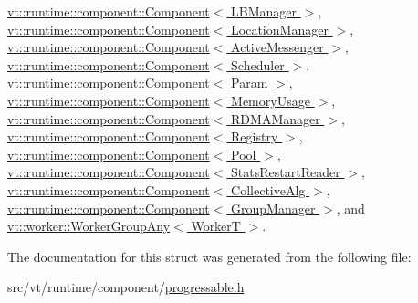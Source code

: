 \hyperlink{structvt_1_1runtime_1_1component_1_1_component_a1dab11d9eb5bed8dfd5a3bb8fdf67f5a}{vt\+::runtime\+::component\+::\+Component$<$ L\+B\+Manager $>$}, \hyperlink{structvt_1_1runtime_1_1component_1_1_component_a1dab11d9eb5bed8dfd5a3bb8fdf67f5a}{vt\+::runtime\+::component\+::\+Component$<$ Location\+Manager $>$}, \hyperlink{structvt_1_1runtime_1_1component_1_1_component_a1dab11d9eb5bed8dfd5a3bb8fdf67f5a}{vt\+::runtime\+::component\+::\+Component$<$ Active\+Messenger $>$}, \hyperlink{structvt_1_1runtime_1_1component_1_1_component_a1dab11d9eb5bed8dfd5a3bb8fdf67f5a}{vt\+::runtime\+::component\+::\+Component$<$ Scheduler $>$}, \hyperlink{structvt_1_1runtime_1_1component_1_1_component_a1dab11d9eb5bed8dfd5a3bb8fdf67f5a}{vt\+::runtime\+::component\+::\+Component$<$ Param $>$}, \hyperlink{structvt_1_1runtime_1_1component_1_1_component_a1dab11d9eb5bed8dfd5a3bb8fdf67f5a}{vt\+::runtime\+::component\+::\+Component$<$ Memory\+Usage $>$}, \hyperlink{structvt_1_1runtime_1_1component_1_1_component_a1dab11d9eb5bed8dfd5a3bb8fdf67f5a}{vt\+::runtime\+::component\+::\+Component$<$ R\+D\+M\+A\+Manager $>$}, \hyperlink{structvt_1_1runtime_1_1component_1_1_component_a1dab11d9eb5bed8dfd5a3bb8fdf67f5a}{vt\+::runtime\+::component\+::\+Component$<$ Registry $>$}, \hyperlink{structvt_1_1runtime_1_1component_1_1_component_a1dab11d9eb5bed8dfd5a3bb8fdf67f5a}{vt\+::runtime\+::component\+::\+Component$<$ Pool $>$}, \hyperlink{structvt_1_1runtime_1_1component_1_1_component_a1dab11d9eb5bed8dfd5a3bb8fdf67f5a}{vt\+::runtime\+::component\+::\+Component$<$ Stats\+Restart\+Reader $>$}, \hyperlink{structvt_1_1runtime_1_1component_1_1_component_a1dab11d9eb5bed8dfd5a3bb8fdf67f5a}{vt\+::runtime\+::component\+::\+Component$<$ Collective\+Alg $>$}, \hyperlink{structvt_1_1runtime_1_1component_1_1_component_a1dab11d9eb5bed8dfd5a3bb8fdf67f5a}{vt\+::runtime\+::component\+::\+Component$<$ Group\+Manager $>$}, and \hyperlink{structvt_1_1worker_1_1_worker_group_any_a1a2d6dc321514501e00c0373f2583146}{vt\+::worker\+::\+Worker\+Group\+Any$<$ Worker\+T $>$}.



The documentation for this struct was generated from the following file\+:\begin{DoxyCompactItemize}
\item 
src/vt/runtime/component/\hyperlink{progressable_8h}{progressable.\+h}\end{DoxyCompactItemize}
